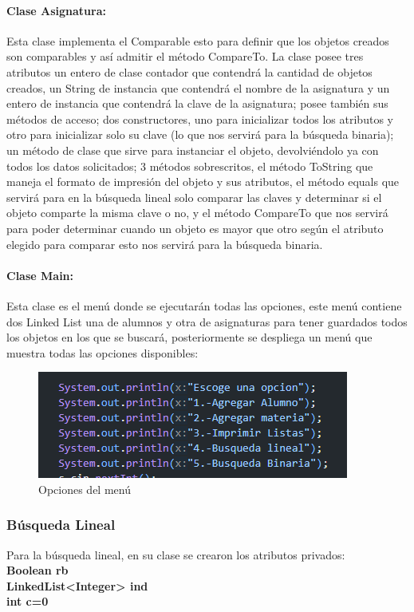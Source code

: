 \documentclass{report}
\begin{document}
\paragraph{Clase Asignatura:}
Esta clase implementa el Comparable esto para definir que los objetos creados son comparables y así admitir el método CompareTo. La clase posee tres atributos un entero de clase contador que contendrá la cantidad de objetos creados, un String de instancia que contendrá el nombre de la asignatura y un entero de instancia que contendrá la clave de la asignatura; posee también sus métodos de acceso; dos constructores, uno para inicializar todos los atributos y otro para inicializar solo su clave (lo que nos servirá para la búsqueda binaria); un método de clase que sirve para instanciar el objeto, devolviéndolo ya con todos los datos solicitados; 3 métodos sobrescritos, el método ToString que maneja el formato de impresión del objeto y sus atributos, el método equals que servirá para en la búsqueda lineal solo comparar las claves y determinar si el objeto comparte la misma clave o no, y el método CompareTo que nos servirá para poder determinar cuando un objeto es mayor que otro según el atributo elegido para comparar esto nos servirá para la búsqueda binaria.
\paragraph{Clase Main:}
Esta clase es el menú donde se ejecutarán todas las opciones, este menú contiene dos Linked List una de alumnos y otra de asignaturas para tener guardados todos los objetos en los que se buscará, posteriormente se despliega un menú que muestra todas las opciones disponibles:

\begin{figure}[h]
    \centering
    \includegraphics[width=0.75\linewidth]{Menu.png}
    \caption{Opciones del menú}
    
\end{figure}
\subsubsection{Búsqueda Lineal}
Para la búsqueda lineal, en su clase se crearon los atributos privados:\\
\textbf{Boolean rb}\\
\textbf{LinkedList<Integer> ind}\\
\textbf{int c=0}\\
\end{document}
